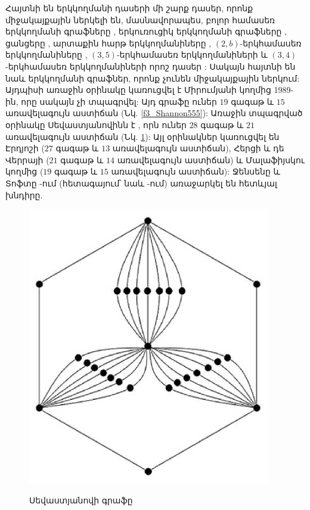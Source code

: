 Հայտնի են երկկողմանի դասերի մի շարք դասեր, որոնք միջակայքային ներկելի են, մասնավորապես, բոլոր համասեռ երկկողմանի գրաֆները \cite{AsratianKamalian1987,AsratianKamalian1994},
երկուռուցիկ երկկողմանի գրաֆները \cite{AsratianDenleyHaggvist1998,Kamalian1990}, ցանցերը \cite{GiaroKubale1997},
արտաքին հարթ երկկողմանիները \cite{GiaroKubale2004}, $\left(2,b\right)$-երկհամասեռ երկկողմանիները \cite{HansonLotenToft1998,KamalianMirumyan1997}, $(3,5)$-երկհամասեռ երկկողմանիների \cite{CasselgrenPetrosyanToft2017} և
$\left(3,4\right)$-երկհամասեռ երկկողմանիների որոշ դասեր \cite{AsratianCasselgrenVandenbusscheWest2009,Pyatkin2004,YangLi2011}: Սակայն հայտնի են նաև երկկողմանի գրաֆներ, որոնք չունեն միջակայքային ներկում: Այդպիսի առաջին օրինակը կառուցվել է Միրումյանի կողմից 1989-ին, որը սակայն չի տպագրվել: Այդ գրաֆը ուներ $19$ գագաթ և $15$ առավելագույն աստիճան (Նկ. \ref{f3_Shannon555}): Առաջին տպագրված օրինակը Սեվաստյանովինն է \cite{Sevastyanov1990}, որն ուներ $28$ գագաթ և $21$ առավելագույն աստիճան (Նկ. \ref{f3_sevastyanov}): Այլ օրինակներ կառուցվել են Էրդյոշի ($27$ գագաթ և $13$ առավելագույն աստիճան), Հերցի և դե Վերրայի ($21$ գագաթ և $14$ առավելագույն աստիճան) և Մալաֆիյսկու կողմից ($19$ գագաթ և $15$ առավելագույն աստիճան): Ջենսենը և Տոֆտը \cite{JensenToft1995}-ում (հետագայում՝ նաև \cite{Stiebitz2012}-ում) առաջարկել են հետևյալ խնդիրը.
\begin{figure}[h]
\begin{center}
\includegraphics[width=25pc]{figures/sevastyanov.eps}\\
\caption{Սեվաստյանովի գրաֆը}\label{f3_sevastyanov}
\end{center}
\end{figure}

